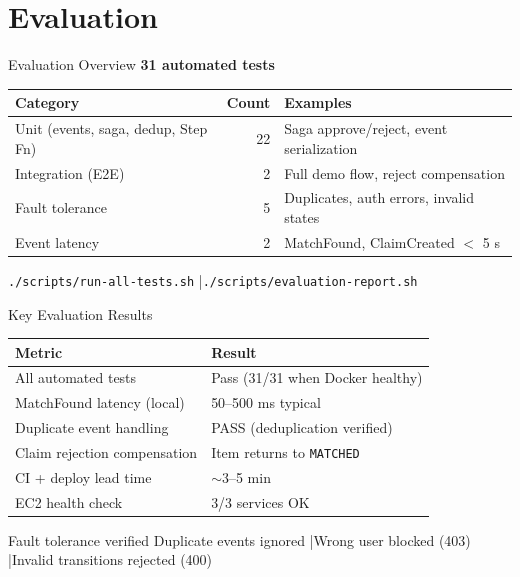 \documentclass[11pt,aspectratio=169]{beamer}
\begin{document}
\section{Evaluation}

\begin{frame}{Evaluation Overview}
  \textbf{31 automated tests}
  \vspace{0.2cm}
  \small
  \begin{tabular}{@{}lrl@{}}
    \toprule
    \textbf{Category} & \textbf{Count} & \textbf{Examples} \\
    \midrule
    Unit (events, saga, dedup, Step Fn) & 22 & Saga approve/reject, event serialization \\
    Integration (E2E)                   &  2 & Full demo flow, reject compensation \\
    Fault tolerance                     &  5 & Duplicates, auth errors, invalid states \\
    Event latency                       &  2 & MatchFound, ClaimCreated $<$ 5 s \\
    \bottomrule
  \end{tabular}
  \vspace{0.4cm}
  \texttt{./scripts/run-all-tests.sh} \quad|\quad \texttt{./scripts/evaluation-report.sh}
\end{frame}

\begin{frame}{Key Evaluation Results}
  \small
  \begin{tabular}{@{}ll@{}}
    \toprule
    \textbf{Metric} & \textbf{Result} \\
    \midrule
    All automated tests        & Pass (31/31 when Docker healthy) \\
    MatchFound latency (local) & 50--500 ms typical \\
    Duplicate event handling   & PASS (deduplication verified) \\
    Claim rejection compensation & Item returns to \texttt{MATCHED} \\
    CI + deploy lead time      & $\sim$3--5 min \\
    EC2 health check           & 3/3 services OK \\
    \bottomrule
  \end{tabular}
  \vspace{0.4cm}
  \begin{block}{Fault tolerance verified}
    Duplicate events ignored \quad|\quad Wrong user blocked (403) \quad|\quad Invalid transitions rejected (400)
  \end{block}
\end{frame}
\end{document}
